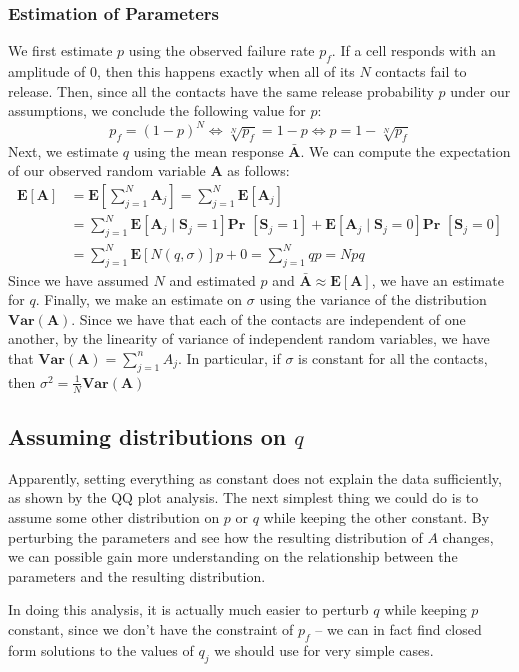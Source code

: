 \documentclass{article}
\def\Pr{\textbf{Pr }}
\def\Var{\textbf{Var}}
\def\E{\textbf{E}}
\newcommand{\rv}[1] {
\text{$\bm{#1}$}
}
\begin{document}
\subsubsection{Estimation of Parameters}
We first estimate $p$ using the observed failure rate $p_f$. If a cell responds with an amplitude of $0$, then this happens exactly when all of its $N$ contacts fail to release. Then, since all the contacts have the same release probability $p$ under our assumptions, we conclude the following value for $p$:
\[
  p_f = (1-p)^N \iff \sqrt[N]{p_f} = 1 - p \iff p = 1 - \sqrt[N]{p_f}
\]
Next, we estimate $q$ using the mean response $\rv{\bar{A}}$. We can compute the expectation of our observed random variable $\rv{A}$ as follows:
\begin{align*}
    \E[\rv{A}] &= \E[\sum_{j=1}^N \rv{A}_j] = \sum_{j=1}^N \E[\rv{A}_j] \\
    &= \sum_{j=1}^N \E[\rv{A}_j \mid \rv{S}_j = 1] \Pr[\rv{S}_j = 1]
    + \E[\rv{A}_j \mid \rv{S}_j = 0] \Pr[\rv{S}_j = 0] \\
    &= \sum_{j=1}^N \E[N(q,\sigma)]p + 0 = \sum_{j=1}^N qp = Npq
\end{align*}
Since we have assumed $N$ and estimated $p$ and $\rv{\bar{A}} \approx \E[\rv{A}]$, we have an estimate for $q$. Finally, we make an estimate on $\sigma$ using the variance of the distribution $\Var(\rv{A})$. Since we have that each of the contacts are independent of one another, by the linearity of variance of independent random variables, we have that $\Var(\rv{A}) = \sum_{j=1}^n A_j$. In particular, if $\sigma$ is constant for all the contacts, then $\sigma^2 = \frac{1}{N} \Var(\rv{A})$

\subsection{Assuming distributions on $q$}
Apparently, setting everything as constant does not explain the data sufficiently, as shown by the QQ plot analysis. The next simplest thing we could do is to assume some other distribution on $p$ or $q$ while keeping the other constant. By perturbing the parameters and see how the resulting distribution of $A$ changes, we can possible gain more understanding on the relationship between the parameters and the resulting distribution.

In doing this analysis, it is actually much easier to perturb $q$ while keeping $p$ constant, since we don't have the constraint of $p_f$ -- we can in fact find closed form solutions to the values of $q_j$ we should use for very simple cases.
\end{document}
